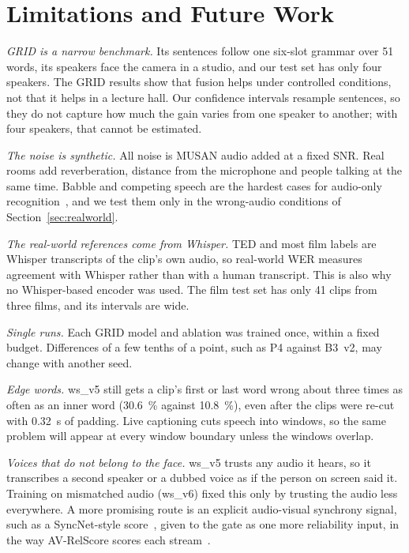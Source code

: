 \section{Limitations and Future Work}
\label{sec:limitations}

\textit{GRID is a narrow benchmark.} Its sentences follow one six-slot grammar over 51 words, its
speakers face the camera in a studio, and our test set has only four speakers. The GRID results
show that fusion helps under controlled conditions, not that it helps in a lecture hall. Our
confidence intervals resample sentences, so they do not capture how much the gain varies from one
speaker to another; with four speakers, that cannot be estimated.

\textit{The noise is synthetic.} All noise is MUSAN audio added at a fixed SNR. Real rooms add
reverberation, distance from the microphone and people talking at the same time. Babble and
competing speech are the hardest cases for audio-only recognition~\cite{shi2022robust}, and we test
them only in the wrong-audio conditions of Section~\ref{sec:realworld}.

\textit{The real-world references come from Whisper.} TED and most film labels are Whisper
transcripts of the clip's own audio, so real-world WER measures agreement with Whisper rather than
with a human transcript. This is also why no Whisper-based encoder was used. The film test set has
only 41 clips from three films, and its intervals are wide.

\textit{Single runs.} Each GRID model and ablation was trained once, within a fixed budget.
Differences of a few tenths of a point, such as P4 against B3~v2, may change with another seed.

\textit{Edge words.} ws\_v5 still gets a clip's first or last word wrong about three times as
often as an inner word (30.6~\% against 10.8~\%), even after the clips were re-cut with 0.32~s of
padding. Live captioning cuts speech into windows, so the same problem will appear at every window
boundary unless the windows overlap.

\textit{Voices that do not belong to the face.} ws\_v5 trusts any audio it hears, so it transcribes
a second speaker or a dubbed voice as if the person on screen said it. Training on mismatched audio
(ws\_v6) fixed this only by trusting the audio less everywhere. A more promising route is an explicit
audio-visual synchrony signal, such as a SyncNet-style score~\cite{chung2017}, given to the gate as
one more reliability input, in the way AV-RelScore scores each stream~\cite{hong2023}.

